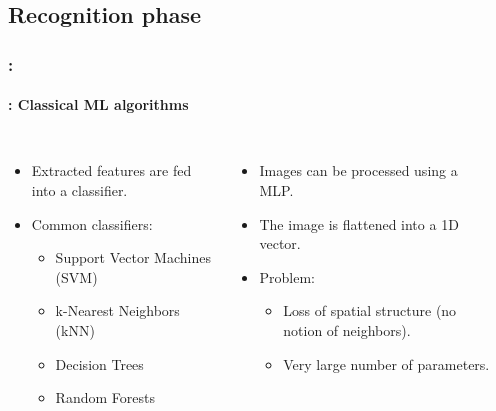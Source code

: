 \documentclass[xcolor=table]{beamer}
\begin{document}
\subsection{Recognition phase}

\begin{frame}
	\frametitle{\insertshortsubtitle: \insertsection}
	\framesubtitle{\insertsubsection: Classical ML algorithms}
	
	\begin{columns}
		
	
		\begin{itemize}
			\item Extracted features are fed into a classifier.
			\item Common classifiers:
			\begin{itemize}
				\item Support Vector Machines (SVM)
				\item k-Nearest Neighbors (kNN)
				\item Decision Trees
				\item Random Forests
			\end{itemize}
		\end{itemize}
		
		
		\begin{itemize}
			\item Images can be processed using a MLP.
			
			\item The image is flattened into a 1D vector.
			
			\item Problem:
			\begin{itemize}
				\item Loss of spatial structure (no notion of neighbors).
				\item Very large number of parameters.
			\end{itemize}
			
		\end{itemize}
		
		\begin{center}
		\end{center}
		
	\end{columns}
		
	
\end{frame}
\end{document}
